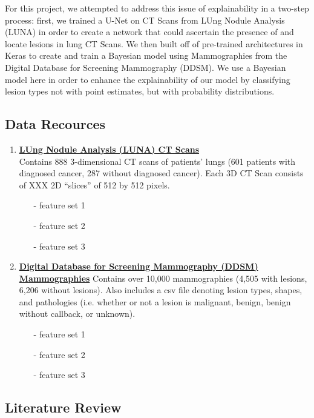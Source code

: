 \documentclass[12pt]{article}
\begin{document}
{For this project, we attempted to address this issue of explainability in a two-step process: first, we trained a U-Net on CT Scans from LUng Nodule Analysis (LUNA) in order to create a network that could ascertain the presence of and locate lesions in lung CT Scans. We then built off of pre-trained architectures in Keras to create and train a Bayesian model using Mammographies from the Digital Database for Screening Mammography (DDSM). We use a Bayesian model here in order to enhance the explainability of our model by classifying lesion types not with point estimates, but with probability distributions. 

\subsection*{Data Recources}

\begin{enumerate}
\item \textbf{\href{https://wiki.cancerimagingarchive.net/display/Public/LIDC-IDRI}{LUng Nodule Analysis (LUNA) CT Scans}}\\
Contains 888 3-dimensional CT scans of patients' lungs (601 patients with diagnosed cancer, 287 without diagnosed cancer). Each 3D CT Scan consists of XXX 2D ``slices'' of 512 by 512 pixels.

\begin{itemize}
\item[-] feature set 1
\item[-] feature set 2
\item[-] feature set 3
\end{itemize}

\item \textbf{\href{https://www.ncbi.nlm.nih.gov/pmc/articles/PMC3041807}{Digital Database for Screening Mammography (DDSM) Mammographies}}
Contains over 10,000 mammographies (4,505 with lesions, 6,206 without lesions). Also includes a csv file denoting lesion types, shapes, and pathologies (i.e. whether or not a lesion is malignant, benign, benign without callback, or unknown). 

\begin{itemize}
\item[-] feature set 1
\item[-] feature set 2
\item[-] feature set 3
\end{itemize}
\end{enumerate}

\subsection*{Literature Review}

}
\end{document}
